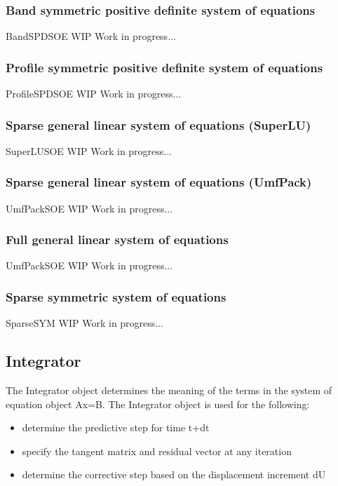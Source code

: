 \subsubsection{Band symmetric positive definite system of equations}
BandSPDSOE WIP Work in progress...

\subsubsection{Profile symmetric positive definite system of equations}
ProfileSPDSOE WIP Work in progress...

\subsubsection{Sparse general linear system of equations (SuperLU)}
SuperLUSOE WIP Work in progress...

\subsubsection{Sparse general linear system of equations (UmfPack)}
UmfPackSOE WIP Work in progress...

\subsubsection{Full general linear system of equations}
UmfPackSOE WIP Work in progress...

\subsubsection{Sparse symmetric system of equations}
SparseSYM WIP Work in progress...

\subsection{Integrator}
The Integrator object determines the meaning of the terms in the system of equation object Ax=B. The Integrator object is used for the following:
\begin{itemize}
\item determine the predictive step for time t+dt
\item specify the tangent matrix and residual vector at any iteration
\item determine the corrective step based on the displacement increment dU
\end{itemize}

